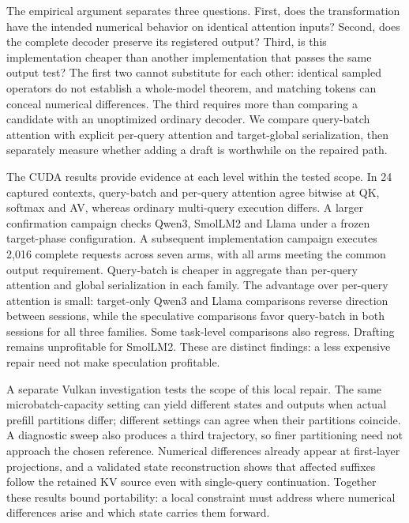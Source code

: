 The empirical argument separates three questions. First, does the transformation have the intended numerical behavior on identical attention inputs? Second, does the complete decoder preserve its registered output? Third, is this implementation cheaper than another implementation that passes the same output test? The first two cannot substitute for each other: identical sampled operators do not establish a whole-model theorem, and matching tokens can conceal numerical differences. The third requires more than comparing a candidate with an unoptimized ordinary decoder. We compare query-batch attention with explicit per-query attention and target-global serialization, then separately measure whether adding a draft is worthwhile on the repaired path.

The CUDA results provide evidence at each level within the tested scope. In 24 captured contexts, query-batch and per-query attention agree bitwise at QK, softmax and AV, whereas ordinary multi-query execution differs. A larger confirmation campaign checks Qwen3, SmolLM2 and Llama under a frozen target-phase configuration. A subsequent implementation campaign executes 2,016 complete requests across seven arms, with all arms meeting the common output requirement. Query-batch is cheaper in aggregate than per-query attention and global serialization in each family. The advantage over per-query attention is small: target-only Qwen3 and Llama comparisons reverse direction between sessions, while the speculative comparisons favor query-batch in both sessions for all three families. Some task-level comparisons also regress. Drafting remains unprofitable for SmolLM2. These are distinct findings: a less expensive repair need not make speculation profitable.

A separate Vulkan investigation tests the scope of this local repair. The same microbatch-capacity setting can yield different states and outputs when actual prefill partitions differ; different settings can agree when their partitions coincide. A diagnostic sweep also produces a third trajectory, so finer partitioning need not approach the chosen reference. Numerical differences already appear at first-layer projections, and a validated state reconstruction shows that affected suffixes follow the retained KV source even with single-query continuation. Together these results bound portability: a local constraint must address where numerical differences arise and which state carries them forward.

